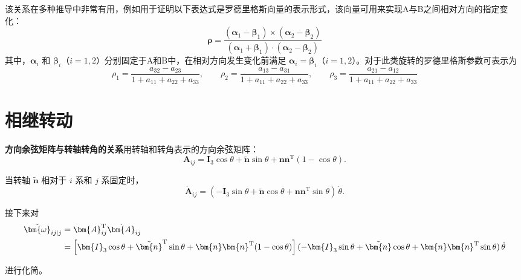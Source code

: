 该关系在多种推导中非常有用，例如用于证明以下表达式是罗德里格斯向量的表示形式，该向量可用来实现A与B之间相对方向的指定变化：
$$\bm{\rho} = \frac{(\bm{\alpha}_1 - \bm{\beta}_1) \times (\bm{\alpha}_2 - \bm{\beta}_2)}{(\bm{\alpha}_1 + \bm{\beta}_1) \cdot (\bm{\alpha}_2 - \bm{\beta}_2)}$$
其中，$\bm{\alpha}_i$ 和 $\bm{\beta}_i$（$i = 1, 2$）分别固定于A和B中，在相对方向发生变化前满足 $\bm{\alpha}_i = \bm{\beta}_i$（$i = 1, 2$）。对于此类旋转的罗德里格斯参数可表示为
$$\rho_1 = \frac{a_{32} - a_{23}}{1 + a_{11} + a_{22} + a_{33}}, \qquad \rho_2 = \frac{a_{13} - a_{31}}{1 + a_{11} + a_{22} + a_{33}}, \qquad \rho_3 = \frac{a_{21} - a_{12}}{1 + a_{11} + a_{22} + a_{33}}$$
\section{相继转动}

\textbf{方向余弦矩阵与转轴转角的关系}\quad 用转轴和转角表示的方向余弦矩阵：
\begin{equation}
    \bm{A}_{ij} = \bm{I}_3\cos\theta + \tilde{\bm{n}}\sin\theta + \bm{n}\bm{n}^{\mathrm{T}}(1-\cos\theta).
\end{equation}

当转轴 $\tilde{\bm{n}}$ 相对于 $i$ 系和 $j$ 系固定时，
\begin{equation}
    \dot{\bm{A}}_{ij} = (-\bm{I}_3\sin\theta + \tilde{\bm{n}}\cos\theta + \bm{n}\bm{n}^{\mathrm{T}}\sin\theta)\,\dot{\theta}.
\end{equation}

接下来对
\begin{align}
    \tilde{\bm{\omega}}_{ij|j} &= \bm{A}_{ij}^{\mathrm{T}}\dot{\bm{A}}_{ij}\notag\\
    &= \left[\bm{I}_3\cos\theta + \tilde{\bm{n}}^{\mathrm{T}}\sin\theta + \bm{n}\bm{n}^{\mathrm{T}}(1-\cos\theta)\right](-\bm{I}_3\sin\theta + \tilde{\bm{n}}\cos\theta + \bm{n}\bm{n}^{\mathrm{T}}\sin\theta)\,\dot{\theta}
\end{align}

进行化简。

